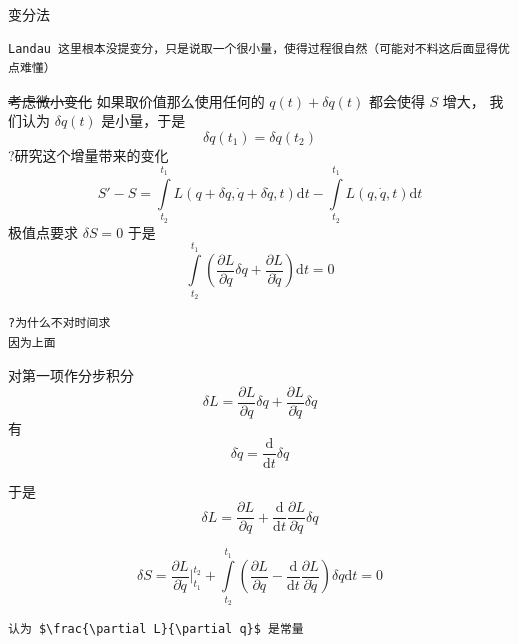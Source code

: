 \documentclass[11pt]{article}
\begin{document}
变分法

\begin{verbatim}
Landau 这里根本没提变分，只是说取一个很小量，使得过程很自然（可能对不料这后面显得优点难懂）
\end{verbatim}

\sout{考虑微小变化}
如果取价值那么使用任何的 \(q(t)+\delta q(t)\) 都会使得 \(S\) 增大，
我们认为 \(\delta q(t)\) 是小量，于是
\begin{equation}
\label{eq:3}
\delta q(t_1)=\delta q(t_2)
\end{equation}
?研究这个增量带来的变化
\begin{equation}
\label{eq:1}
S'- S = \int\limits_{t_2}^{t_1}L(q+\delta q,\dot{q}+\delta \dot{q},t)\mathrm{d}t - \int\limits_{t_2}^{t_1}L(q,\dot{q},t)\mathrm{d}t
\end{equation}  
极值点要求 \(\delta S=0\)
于是
\begin{equation}
\label{eq:2}
\int\limits_{t_2}^{t_1}(\frac{\partial L}{\partial q}\delta q+\frac{\partial L}{\partial \dot{q}})\mathrm{d}t=0
\end{equation}

\begin{verbatim}
?为什么不对时间求
因为上面
\end{verbatim}

对第一项作分步积分
\begin{equation}
\label{eq:7}
\delta L=\frac{\partial L}{\partial q}\delta q+\frac{\partial L}{\partial \dot{q}}\delta \dot{q}
\end{equation}
有
\begin{equation}
\label{eq:8}
\delta \dot{q}=\frac{\mathrm{d}}{\mathrm{d}t}\delta q
\end{equation}

于是
\begin{equation}
\label{eq:9}
\delta L =\frac{\partial L}{\partial q}+\frac{\mathrm{d}}{\mathrm{d}t}\frac{\partial L}{\partial \dot{q}}\delta q
\end{equation}


\begin{equation}
\label{eq:4}
\delta S=\frac{\partial L}{\partial \dot{q}}\big|^{t_2}_{t_1}+\int\limits_{t_2}^{t_1}(\frac{\partial L}{\partial q}-\frac{\mathrm{d}}{\mathrm{d}t}\frac{\partial L}{\partial \dot{q}})\delta q\mathrm{d}t=0
\end{equation}
\begin{verbatim}
认为 $\frac{\partial L}{\partial q}$ 是常量
\end{verbatim}
\end{document}
